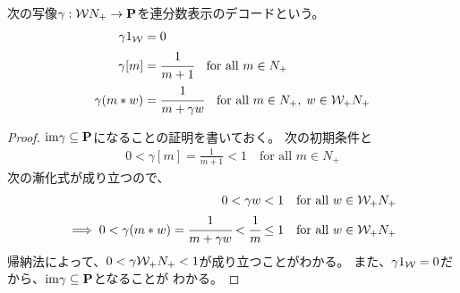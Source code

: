 	\begin{definition}[連分数表示のデコード]
	\label{def:連分数表示のエンコード} %
		次の写像$\gamma:{{\mathcal{W}}} N_+\to{{\ensuremath{\mathbf{P}}}}$を連分数表示のデコードという。
		\begin{equation*}\begin{split}
			\gamma1_{{\mathcal{W}}} &= 0 \\
			\gamma[m] &= \cfrac{1}{m + 1} \quad\text{for all }m\in N_+ \\
			\gamma(m*w) &= \cfrac{1}{m + \gamma w}
			\quad\text{for all }m\in N_+,\;w\in {\ensuremath{{\mathcal{W}}}}_+N_+ \\
		\end{split}\end{equation*}
	\end{definition} %
	\begin{proof} ${\operatorname{im}}\gamma\subseteq{{\ensuremath{\mathbf{P}}}}$になることの証明を書いておく。
	次の初期条件と
	\begin{equation*}\begin{split}
		0 < \gamma[m] = \frac{1}{m + 1} < 1 \quad\text{for all }m\in N_+
	\end{split}\end{equation*}
	次の漸化式が成り立つので、
	\begin{equation*}\begin{split}
		0<\gamma w<1 \quad\text{for all }w\in {\ensuremath{{\mathcal{W}}}}_+N_+ \\
		\implies
		0 < \gamma(m*w) = \cfrac{1}{m + \gamma w} < \cfrac{1}{m} \le 1
		\quad\text{for all }w\in {\ensuremath{{\mathcal{W}}}}_+N_+
	\end{split}\end{equation*}
	帰納法によって、$0<\gamma{\ensuremath{{\mathcal{W}}}}_+N_+<1$が成り立つことがわかる。
	また、$\gamma1_{{\mathcal{W}}}=0$だから、${\operatorname{im}}\gamma\subseteq{{\ensuremath{\mathbf{P}}}}$となることが
	わかる。
	\end{proof}

